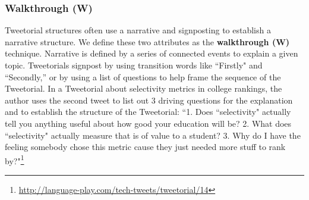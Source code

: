 


\subsubsection{Walkthrough (W)}
Tweetorial structures often use a narrative and signposting to establish a narrative structure. We define these two attributes as the \textbf{walkthrough (W)} technique. Narrative is defined by a series of connected events to explain a given topic. Tweetorials signpost by using transition words like ``Firstly" and ``Secondly,'' or by using a list of questions to help frame the sequence of the Tweetorial. In a Tweetorial about selectivity metrics in college rankings, the author uses the second tweet to list out 3 driving questions for the explanation and to establish the structure of the Tweetorial: ``1. Does ``selectivity" actually tell you anything useful about how good your education will be? 2. What does ``selectivity" actually measure that is of value to a student? 3. Why do I have the feeling somebody chose this metric cause they just needed more stuff to rank by?"\footnote{\href{http://language-play.com/tech-tweets/tweetorial/14}{http://language-play.com/tech-tweets/tweetorial/14}} 

